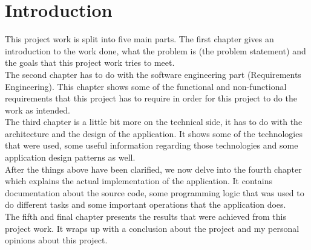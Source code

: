 \chapter{Introduction}
This project work is split into five main parts. 
The first chapter gives an introduction to the work done, what the problem is (the problem statement) and the goals that this project work tries to meet.\\
\newline
The second chapter has to do with the software engineering part (Requirements Engineering). This chapter shows some of the functional and non-functional requirements that this project has to require in order for this project to do the work as intended.\\
\newline
The third chapter is a little bit more on the technical side, it has to do with the architecture and the design of the application. It shows some of the technologies that were used, some useful information regarding those technologies and some application design patterns as well.\\
\newline
After the things above have been clarified, we now delve into the fourth chapter which explains the actual implementation of the application. It contains documentation about the source code, some programming logic that was used to do different tasks and some important operations that the application does.\\
\newline
The fifth and final chapter presents the results that were achieved from this project work. It wraps up with a conclusion about the project and my personal opinions about this project.
\newpage
